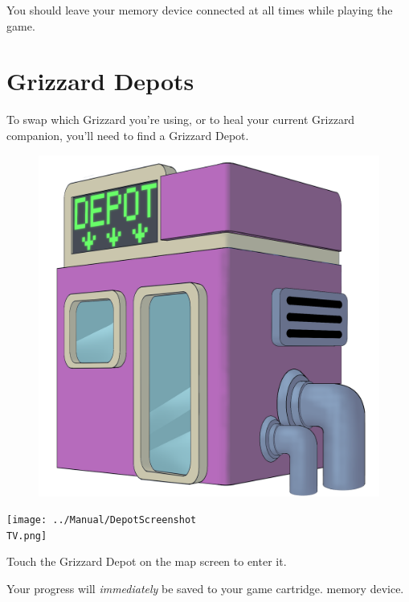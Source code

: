 \documentclass[10pt,twocolumn,openany,article]{memoir}
\newcommand\TV{NTSC}
\newcommand\TV{PAL}
\newcommand\TV{SECAM}
\begin{document}
\ifdefined\ATARIAGESAVE\else

You should leave your memory device connected at all times while playing
the game.

\fi \fi

\section{Grizzard Depots}\label{sec:GrizzardDepot}

To \ifdefined\NOSAVE\else  swap which  Grizzard you're using,  or to  \fi heal
your current Grizzard companion, you'll need to find a Grizzard Depot.

\begin{figure}[hb]
  \begin{center}
    \includegraphics[width=2\columnwidth]{../Manual/GrizzardDepot.png}
  \end{center}
\end{figure}

\begin{center}
  \texttt{[image: ../Manual/DepotScreenshot\\TV.png]}
\end{center}

Touch the Grizzard Depot on the map screen to enter it.

\ifdefined\NOSAVE\else Your progress will \emph{immediately} be saved to
your \ifdefined\ATARIAGESAVE  game cartridge.  \else memory  device. \fi
\fi
\end{document}
